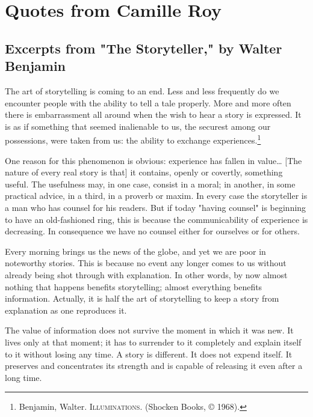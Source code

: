 \documentclass[
]{memoir}
\begin{document}
\hypertarget{quotes-from-camille-roy}{%
\section*{Quotes from Camille Roy}\label{quotes-from-camille-roy}}

\hypertarget{excerpts-from-the-storyteller-by-walter-benjamin}{%
\subsection*{Excerpts from "The Storyteller," by Walter
Benjamin}\label{excerpts-from-the-storyteller-by-walter-benjamin}}

The art of storytelling is coming to an end. Less and less frequently do
we encounter people with the ability to tell a tale properly. More and
more often there is embarrassment all around when the wish to hear a
story is expressed. It is as if something that seemed inalienable to us,
the securest among our possessions, were taken from us: the ability to
exchange experiences.\footnote{Benjamin, Walter. \textsc{Illuminations}.
  (Shocken Books, © 1968).}

One reason for this phenomenon is obvious: experience has fallen in
value\ldots{} {[}The nature of every real story is that{]} it contains,
openly or covertly, something useful. The usefulness may, in one case,
consist in a moral; in another, in some practical advice, in a third, in
a proverb or maxim. In every case the storyteller is a man who has
counsel for his readers. But if today "having counsel" is beginning to
have an old-fashioned ring, this is because the communicability of
experience is decreasing. In consequence we have no counsel either for
ourselves or for others.

Every morning brings us the news of the globe, and yet we are poor in
noteworthy stories. This is because no event any longer comes to us
without already being shot through with explanation. In other words, by
now almost nothing that happens benefits storytelling; almost everything
benefits information. Actually, it is half the art of storytelling to
keep a story from explanation as one reproduces it.

The value of information does not survive the moment in which it was
new. It lives only at that moment; it has to surrender to it completely
and explain itself to it without losing any time. A story is different.
It does not expend itself. It preserves and concentrates its strength
and is capable of releasing it even after a long time.
\end{document}
